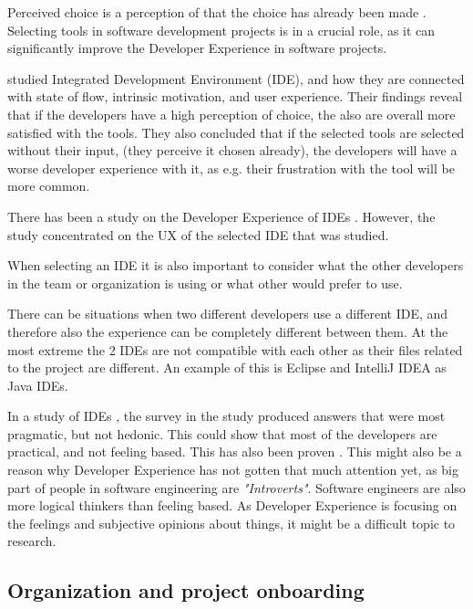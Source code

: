 \documentclass[english, 12pt, a4paper, sci, utf8, a-1b, online]{aaltothesis}
\begin{document}
Perceived choice is a perception of that the choice has already been made \citep{flow-intrinsic-dx}. Selecting tools in software development projects is in a crucial role, as it can significantly improve the Developer Experience in software projects.

\cite{flow-intrinsic-dx} studied Integrated Development Environment (IDE), and how they are connected with state of flow, intrinsic motivation, and user experience. Their findings reveal that if the developers have a high perception of choice, the also are overall more satisfied with the tools. They also concluded that if the selected tools are selected without their input, (they perceive it chosen already), the developers will have a worse developer experience with it, as e.g. their frustration with the tool will be more common.

There has been a study on the Developer Experience of IDEs \citep{software-developers-as-users}. However, the study concentrated on the UX of the selected IDE that was studied.

When selecting an IDE it is also important to consider what the other developers in the team or organization is using or what other would prefer to use.

\cite{design-framework-enchancing}

There can be situations when two different developers use a different IDE, and therefore also the experience can be completely different between them. At the most extreme the 2 IDEs are not compatible with each other as their files related to the project are different. An example of this is Eclipse and IntelliJ IDEA as Java IDEs.

In a study of IDEs \citep{software-developers-as-users}, the survey in the study produced answers that were most pragmatic, but not hedonic. This could show that most of the developers are practical, and not feeling based. This has also been proven \citep{personality-software}. This might also be a reason why Developer Experience has not gotten that much attention yet, as big part of people in software engineering are \textit{"Introverts"}. Software engineers are also more logical thinkers than feeling based. As Developer Experience is focusing on the feelings and subjective opinions about things, it might be a difficult topic to research.

\subsection{Organization and project onboarding}
\end{document}

